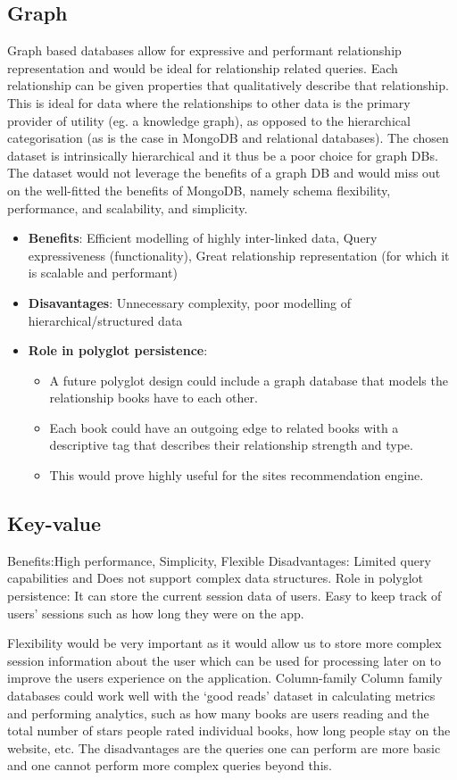 \documentclass[11pt]{article}
\begin{document}
\subsection{Graph}
\label{sec:orga893f53}
Graph based databases allow for expressive and performant relationship representation and would be ideal for relationship related queries. Each relationship can be given properties that qualitatively describe that relationship. This is ideal for data where the relationships to other data is the primary provider of utility (eg. a knowledge graph), as opposed to the hierarchical categorisation (as is the case in MongoDB and relational databases). The chosen dataset is intrinsically hierarchical and it thus be a poor choice for graph DBs. The dataset would not leverage the benefits of a graph DB and would miss out on the well-fitted the benefits of MongoDB, namely schema flexibility, performance, and scalability, and simplicity.
\begin{itemize}
\item \textbf{Benefits}: Efficient modelling of highly inter-linked data, Query expressiveness (functionality), Great relationship representation (for which it is scalable and performant)
\item \textbf{Disavantages}: Unnecessary complexity, poor modelling of hierarchical/structured data
\item \textbf{Role in polyglot persistence}:
\begin{itemize}
\item A future polyglot design could include a graph database that models the relationship books have to each other.
\item Each book could have an outgoing edge to related books with a descriptive tag that describes their relationship strength and type.
\item This would prove highly useful for the sites recommendation engine.
\end{itemize}
\end{itemize}
\subsection{Key-value}
\label{sec:org2690425}
Benefits:High performance, Simplicity, Flexible
Disadvantages: Limited query capabilities and Does not support complex data structures.
Role in polyglot persistence: It can store the current session data of users. Easy to keep track of users' sessions such as how long they were on the app.

Flexibility would be very important as it would allow us to store more complex session information about the user which can be used for processing later on to improve the users experience on the application.
Column-family
Column family databases could work well with the ‘good reads' dataset in calculating metrics and performing analytics, such as how many books are users reading and the total number of stars people rated individual books, how long people stay on the website, etc. The disadvantages are the queries one can perform are more basic and one cannot perform more complex queries beyond this.
\end{document}
